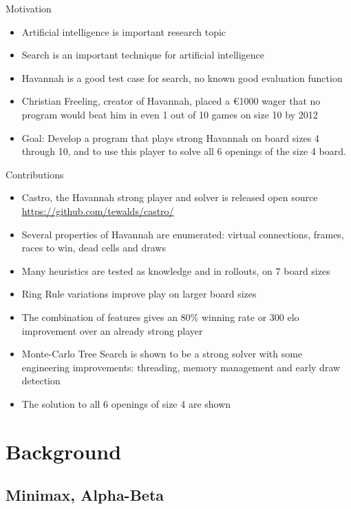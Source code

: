 \documentclass{beamer} %
\begin{document}
\begin{frame}{Motivation}
\begin{itemize}
	\item Artificial intelligence is important research topic
	\item Search is an important technique for artificial intelligence
	\item Havannah is a good test case for search, no known good evaluation function
	\item Christian Freeling, creator of Havannah, placed a \euro 1000 wager that no program would beat him in even 1 out of 10 games on size 10 by 2012
	\item Goal: Develop a program that plays strong Havannah on board sizes 4 through 10, and to use this player to solve all 6 openings of the size 4 board.
\end{itemize}
\end{frame}

\begin{frame}{Contributions}
\begin{itemize}
	\item Castro, the Havannah strong player and solver is released open source \url{https://github.com/tewalds/castro/}
	\item Several properties of Havannah are enumerated: virtual connections, frames, races to win, dead cells and draws
	\item Many heuristics are tested as knowledge and in rollouts, on 7  board sizes
	\item Ring Rule variations improve play on larger board sizes
	\item The combination of features gives an 80\% winning rate or 300 elo improvement over an already strong player
	\item Monte-Carlo Tree Search is shown to be a strong solver with some engineering improvements: threading, memory management and early draw detection
	\item The solution to all 6 openings of size 4 are shown
\end{itemize}
\end{frame}


\section{Background}

\subsection{Minimax, Alpha-Beta}
\end{document}
